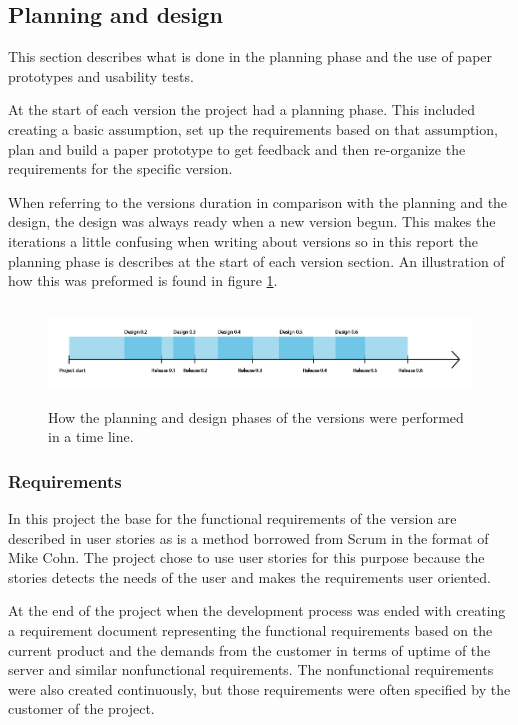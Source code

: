 \subsection{Planning and design}
\label{planning-intro}
This section describes what is done in the planning phase and the use of paper prototypes and usability tests.

At the start of each version the project had a planning phase. This included creating a basic assumption, set up the requirements based on that assumption, plan and build a paper prototype to get feedback and then re-organize the requirements for the specific version.

When referring to the versions duration in comparison with the planning and the design, the design was always ready when a new version begun. This makes the iterations a little confusing when writing about versions so in this report the planning phase is describes at the start of each version section. An illustration of how this was preformed is found in figure \ref{figs:design-implementation}.

\begin{figure}
\centering
\includegraphics[height=2.6cm]{figs/design-vs-implementation.png}
\caption{How the planning and design phases of the versions were performed in a time line.}
\label{figs:design-implementation}
\end{figure}


\subsubsection{Requirements}
In this project the base for the functional requirements of the version are described in user stories as is a method borrowed from Scrum in the format of Mike Cohn.\cite{scrum-user-stories} The project chose to use user stories for this purpose because the stories detects the needs of the user and makes the requirements user oriented.

At the end of the project when the development process was ended with creating a requirement document representing the functional requirements based on the current product and the demands from the customer in terms of uptime of the server and similar nonfunctional requirements. The nonfunctional requirements were also created continuously, but those requirements were often specified by the customer of the project.

